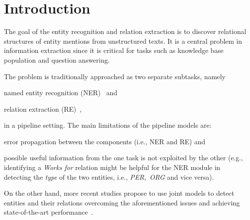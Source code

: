 \documentclass[review]{elsarticle}
\newcommand{\eg}{e.g., }
\newcommand{\ie}{i.e., }
\begin{document}
\label{sec:main_text}
\setcounter{equation}{0}
\setcounter{figure}{0}
\setcounter{table}{0}
\setcounter{page}{1}
\makeatletter
\renewcommand{\bibnumfmt}[1]{[S#1]}
\renewcommand{\citenumfont}[1]{S#1}


\section{Introduction}
\noindent The goal of the entity recognition and relation extraction is to discover relational structures
of entity mentions from unstructured texts. It is a central problem in information extraction since it is critical for tasks such as knowledge base population and question answering.

The problem is traditionally approached as two separate subtasks, namely
\begin{enumerate*}[label=(\roman*)]
\item named entity recognition (NER)~\citep{nadeau:07} and
\item relation extraction (RE)~\citep{bach:07},
\end{enumerate*}
in a pipeline setting.
The main limitations of the pipeline models are:
\begin{enumerate*}[label=(\roman*)]
\item error propagation between the components (\ie NER and RE) and
\item possible useful information from the one task is not exploited by the other (\eg identifying a \emph{Works for} relation might be helpful for the NER module in detecting the \emph{type} of the two entities, \ie \emph{PER},~\emph{ORG} and vice versa). 
\end{enumerate*}
On the other hand, more recent studies propose to use joint models to detect entities and their relations overcoming the aforementioned issues and achieving state-of-the-art performance~\citep{li:14,miwa:14}.
\end{document}
